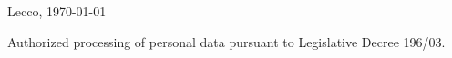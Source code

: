 \documentclass[11pt,a4paper,sans]{moderncv} %
\begin{document}

\vspace{-1em}

%

%
%

\vspace*{\fill}

\noindent Lecco, \today\par
\vspace{0.5em}
{\scriptsize\centering
Authorized processing of personal data pursuant to Legislative Decree 196/03.\par}
    
    
\end{document}
